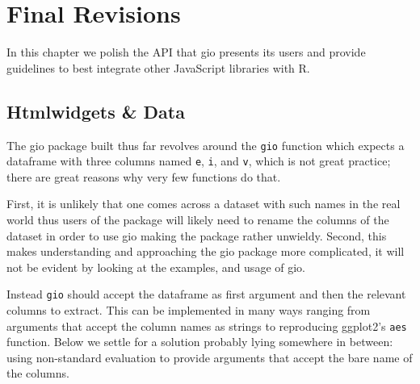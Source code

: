 \documentclass[
]{krantz}
\begin{document}
\hypertarget{widgets-final}{%
\chapter{Final Revisions}\label{widgets-final}}

In this chapter we polish the API that gio presents its users and provide guidelines to best integrate other JavaScript libraries with R.

\hypertarget{widgets-final-data}{%
\section{Htmlwidgets \& Data}\label{widgets-final-data}}

The gio package built thus far revolves around the \texttt{gio} function which expects a dataframe with three columns named \texttt{e}, \texttt{i}, and \texttt{v}, which is not great practice; there are great reasons why very few functions do that.

First, it is unlikely that one comes across a dataset with such names in the real world thus users of the package will likely need to rename the columns of the dataset in order to use gio making the package rather unwieldy. Second, this makes understanding and approaching the gio package more complicated, it will not be evident by looking at the examples, and usage of gio.

Instead \texttt{gio} should accept the dataframe as first argument and then the relevant columns to extract. This can be implemented in many ways ranging from arguments that accept the column names as strings to reproducing ggplot2's \texttt{aes} function. Below we settle for a solution probably lying somewhere in between: using non-standard evaluation to provide arguments that accept the bare name of the columns.
\end{document}
